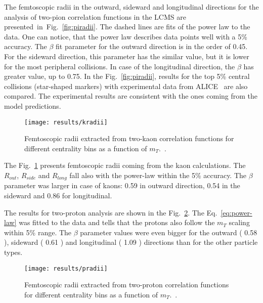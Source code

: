       The femtoscopic radii in the outward, sideward and longitudinal directions for the analysis of two-pion correlation functions in the LCMS are presented~in~Fig.~\ref{fig:piradii}.
      The dashed lines are fits of the power law to the data.
      One can notice, that the power law describes data points well with a 5\% accuracy.
      The $\beta$ fit parameter for the outward direction is in the order of 0.45.
      For the sideward direction, this parameter has the similar value, but it is lower for the most peripheral collisions.
      In case of the longitudinal direction, the $\beta$ has greater value, up to 0.75.
      In the Fig.~\ref{fig:piradii}, results for the top 5\% central collisions (star-shaped markers) with experimental data from ALICE~\cite{alice_pion} are also compared.
      The experimental results are consistent with the ones coming from the model predictions.
      \begin{figure}[b]
        \centering
        \centerline{\texttt{[image: results/kradii]}}
        \caption{Femtoscopic radii extracted from two-kaon correlation functions for different centrality bins as a function of $m_T$.~\cite{galazyn}.}
      \label{fig:kradii}
      \end{figure}

      The Fig.~\ref{fig:kradii} presents femtoscopic radii coming from the kaon calculations.
      The $R_{out}$, $R_{side}$ and $R_{long}$ fall also with the power-law within the 5\% accuracy.
      The $\beta$ parameter was larger in case of kaons: 0.59 in outward direction, 0.54 in the sideward and 0.86 for longitudinal.

      The results for two-proton analysis are shown in the Fig.~\ref{fig:pradii}.
      The Eq.~\ref{eq:power-law} was fitted to the data and tells that the protons also follow the $m_T$ scaling within 5\% range.
      The $\beta$ parameter values were even bigger for the outward ( 0.58 ), sideward ( 0.61 ) and longitudinal ( 1.09 ) directions than for the other particle types. 

      \begin{figure}[b]
        \centering
        \centerline{\texttt{[image: results/pradii]}}
        \caption{Femtoscopic radii extracted from two-proton correlation functions for different centrality bins as a function of $m_T$.~\cite{galazyn}.}
      \label{fig:pradii}
      \end{figure}

